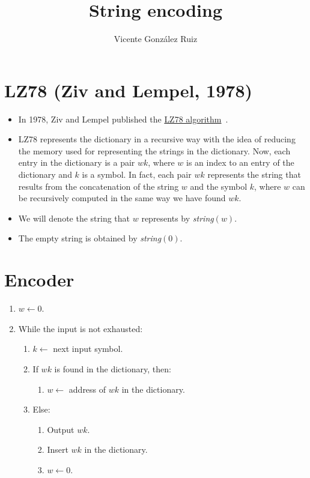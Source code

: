 
\title{String encoding}

\author{Vicente González Ruiz}

\maketitle

\section{LZ78 (Ziv and Lempel, 1978)}

\begin{itemize}
\item
  In 1978, Ziv and Lempel published the
  \href{https://en.wikipedia.org/wiki/LZ77_and_LZ78}{LZ78 algorithm}~\cite{ziv1978compression}.
\item
  LZ78 represents the dictionary in a recursive way with the idea of
  reducing the memory used for representing the strings in the
  dictionary. Now, each entry in the dictionary is a pair \(wk\), where
  \(w\) is an index to an entry of the dictionary and \(k\) is a symbol.
  In fact, each pair \(wk\) represents the string that results from the
  concatenation of the string \(w\) and the symbol \(k\), where \(w\)
  can be recursively computed in the same way we have found \(wk\).
\item
  We will denote the string that \(w\) represents by
  \emph{string}\((w)\).
\item
  The empty string is obtained by \emph{string}\((0)\).
\end{itemize}

\section{Encoder}

\begin{enumerate}
\tightlist
\item
  \(w\leftarrow 0\).
\item
  While the input is not exhausted:
  \begin{enumerate}
  \tightlist
  \item
    \(k\leftarrow\) next input symbol.
  \item
    If \(wk\) is found in the dictionary, then:
    \begin{enumerate}
    \tightlist
    \item
      \(w\leftarrow\) address of \(wk\) in the dictionary.
    \end{enumerate}
  \item
    Else:
    \begin{enumerate}
    \tightlist
    \item
      Output \(wk\).
    \item
      Insert \(wk\) in the dictionary.
    \item
      \(w\leftarrow 0\).
    \end{enumerate}
  \end{enumerate}
\end{enumerate}

